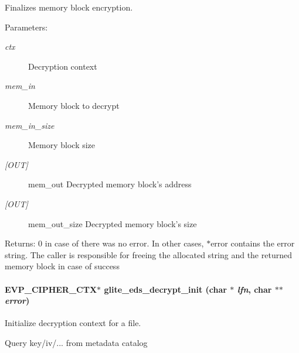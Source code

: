Finalizes memory block encryption. 

\begin{Desc}
\item[Parameters:]
\begin{description}
\item[{\em ctx}]Decryption context \item[{\em mem\_\-in}]Memory block to decrypt \item[{\em mem\_\-in\_\-size}]Memory block size \item[{\em \mbox{[}OUT\mbox{]}}]mem\_\-out Decrypted memory block's address \item[{\em \mbox{[}OUT\mbox{]}}]mem\_\-out\_\-size Decrypted memory block's size\end{description}
\end{Desc}
\begin{Desc}
\item[Returns:]0 in case of there was no error. In other cases, $\ast$error contains the error string. The caller is responsible for freeing the allocated string and the returned memory block in case of success \end{Desc}
\hypertarget{eds-simple_8h_a3}{
\paragraph[glite\_\-eds\_\-decrypt\_\-init]{\setlength{\rightskip}{0pt plus 5cm}EVP\_\-CIPHER\_\-CTX$\ast$ glite\_\-eds\_\-decrypt\_\-init (char $\ast$ {\em lfn}, char $\ast$$\ast$ {\em error})}\hfill}
\label{eds-simple_8h_a3}


Initialize decryption context for a file. 

Query key/iv/... from metadata catalog

